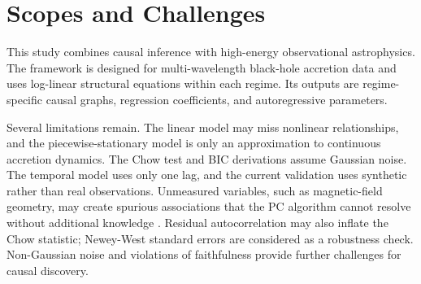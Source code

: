 \section{Scopes and Challenges}
This study combines causal inference with high-energy observational astrophysics.
The framework is designed for multi-wavelength black-hole accretion data and uses
log-linear structural equations within each regime. Its outputs are regime-specific
causal graphs, regression coefficients, and autoregressive parameters.

Several limitations remain. The linear model may miss nonlinear relationships, and
the piecewise-stationary model is only an approximation to continuous accretion
dynamics. The Chow test and BIC derivations assume Gaussian noise. The temporal
model uses only one lag, and the current validation uses synthetic rather than real
observations. Unmeasured variables, such as magnetic-field geometry, may create
spurious associations that the PC algorithm cannot resolve without additional
knowledge \cite{spirtes2000causation}. Residual autocorrelation may also inflate the
Chow statistic; Newey-West standard errors \cite{newey1987} are considered as a
robustness check. Non-Gaussian noise and violations of faithfulness provide further
challenges for causal discovery.
